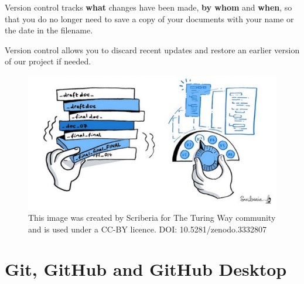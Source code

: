 \documentclass[
  letterpaper,
  DIV=11,
  numbers=noendperiod,
  oneside]{scrreprt}
\begin{document}
\begin{tcolorbox}[enhanced jigsaw, coltitle=black, opacityback=0, title=\textcolor{quarto-callout-tip-color}{\faLightbulb}\hspace{0.5em}{Tip}, toprule=.15mm, bottomtitle=1mm, colbacktitle=quarto-callout-tip-color!10!white, colframe=quarto-callout-tip-color-frame, left=2mm, opacitybacktitle=0.6, bottomrule=.15mm, arc=.35mm, toptitle=1mm, colback=white, titlerule=0mm, breakable, leftrule=.75mm, rightrule=.15mm]

Version control tracks \textbf{what} changes have been made, \textbf{by
whom} and \textbf{when}, so that you do no longer need to save a copy of
your documents with your name or the date in the filename.

\end{tcolorbox}

Version control allows you to discard recent updates and restore an
earlier version of our project if needed.

\begin{figure}

{\centering \includegraphics{images/paste-EB447856.png}

}

\caption{This image was created by Scriberia for The Turing Way
community and is used under a CC-BY licence. DOI:
10.5281/zenodo.3332807}

\end{figure}

\hypertarget{git-github-and-github-desktop}{%
\section{Git, GitHub and GitHub
Desktop}\label{git-github-and-github-desktop}}
\end{document}
